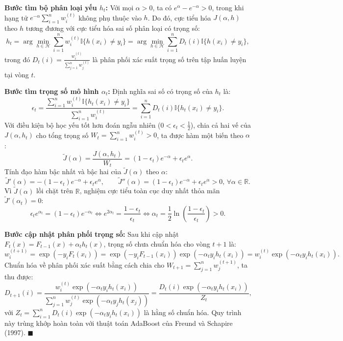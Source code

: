 \documentclass[11pt, a4paper]{article}
\begin{document}
\textbf{Bước tìm bộ phân loại yếu $h_t$:} Với mọi $\alpha > 0$, ta có $e^{\alpha} - e^{-\alpha} > 0$, trong khi hạng tử $e^{-\alpha}\sum_{i=1}^n w_i^{(t)}$ không phụ thuộc vào $h$. Do đó, cực tiểu hóa $J(\alpha, h)$ theo $h$ tương đương với cực tiểu hóa sai số phân loại có trọng số:
\[
h_t = \arg\min_{h \in \mathcal{H}} \sum_{i=1}^{n} w_i^{(t)} \mathbb{I}\{h(x_i) \ne y_i\} = \arg\min_{h \in \mathcal{H}} \sum_{i=1}^{n} D_t(i) \mathbb{I}\{h(x_i) \ne y_i\},
\]
trong đó $D_t(i) = \frac{w_i^{(t)}}{\sum_{j=1}^n w_j^{(t)}}$ là phân phối xác suất trọng số trên tập huấn luyện tại vòng $t$.

\textbf{Bước tìm trọng số mô hình $\alpha_t$:} Định nghĩa sai số có trọng số của $h_t$ là:
\[
\epsilon_t = \frac{\sum_{i=1}^{n} w_i^{(t)} \mathbb{I}\{h_t(x_i) \ne y_i\}}{\sum_{i=1}^{n} w_i^{(t)}} = \sum_{i=1}^{n} D_t(i) \mathbb{I}\{h_t(x_i) \ne y_i\}.
\]
Với điều kiện bộ học yếu tốt hơn đoán ngẫu nhiên ($0 < \epsilon_t < \frac{1}{2}$), chia cả hai vế của $J(\alpha, h_t)$ cho tổng trọng số $W_t = \sum_{i=1}^n w_i^{(t)} > 0$, ta được hàm một biến theo $\alpha$:
\[
\tilde{J}(\alpha) = \frac{J(\alpha, h_t)}{W_t} = (1 - \epsilon_t)e^{-\alpha} + \epsilon_t e^{\alpha}.
\]
Tính đạo hàm bậc nhất và bậc hai của $\tilde{J}(\alpha)$ theo $\alpha$:
\[
\tilde{J}'(\alpha) = -(1 - \epsilon_t)e^{-\alpha} + \epsilon_t e^{\alpha}, \qquad \tilde{J}''(\alpha) = (1 - \epsilon_t)e^{-\alpha} + \epsilon_t e^{\alpha} > 0, \, \forall \alpha \in \mathbb{R}.
\]
Vì $\tilde{J}(\alpha)$ lồi chặt trên $\mathbb{R}$, nghiệm cực tiểu toàn cục duy nhất thỏa mãn $\tilde{J}'(\alpha_t) = 0$:
\[
\epsilon_t e^{\alpha_t} = (1 - \epsilon_t)e^{-\alpha_t} \iff e^{2\alpha_t} = \frac{1 - \epsilon_t}{\epsilon_t} \iff \alpha_t = \frac{1}{2}\ln\left(\frac{1 - \epsilon_t}{\epsilon_t}\right) > 0.
\]

\textbf{Bước cập nhật phân phối trọng số:} Sau khi cập nhật $F_t(x) = F_{t-1}(x) + \alpha_t h_t(x)$, trọng số chưa chuẩn hóa cho vòng $t+1$ là:
\[
w_i^{(t+1)} = \exp(-y_i F_t(x_i)) = \exp(-y_i F_{t-1}(x_i)) \exp(-\alpha_t y_i h_t(x_i)) = w_i^{(t)} \exp(-\alpha_t y_i h_t(x_i)).
\]
Chuẩn hóa về phân phối xác suất bằng cách chia cho $W_{t+1} = \sum_{j=1}^n w_j^{(t+1)}$, ta thu được:
\[
D_{t+1}(i) = \frac{w_i^{(t)} \exp(-\alpha_t y_i h_t(x_i))}{\sum_{j=1}^n w_j^{(t)} \exp(-\alpha_t y_j h_t(x_j))} = \frac{D_t(i) \exp(-\alpha_t y_i h_t(x_i))}{Z_t},
\]
với $Z_t = \sum_{i=1}^n D_t(i) \exp(-\alpha_t y_i h_t(x_i))$ là hằng số chuẩn hóa. Quy trình này trùng khớp hoàn toàn với thuật toán AdaBoost của Freund và Schapire (1997). \hfill $\blacksquare$
\end{document}
